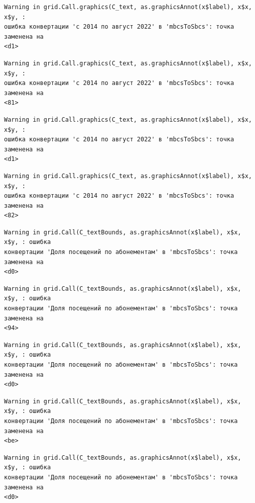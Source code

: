 \documentclass[
  letterpaper,
  DIV=11,
  numbers=noendperiod]{scrreprt}
\begin{document}
\begin{verbatim}
Warning in grid.Call.graphics(C_text, as.graphicsAnnot(x$label), x$x, x$y, :
ошибка конвертации 'с 2014 по август 2022' в 'mbcsToSbcs': точка заменена на
<d1>
\end{verbatim}

\begin{verbatim}
Warning in grid.Call.graphics(C_text, as.graphicsAnnot(x$label), x$x, x$y, :
ошибка конвертации 'с 2014 по август 2022' в 'mbcsToSbcs': точка заменена на
<81>
\end{verbatim}

\begin{verbatim}
Warning in grid.Call.graphics(C_text, as.graphicsAnnot(x$label), x$x, x$y, :
ошибка конвертации 'с 2014 по август 2022' в 'mbcsToSbcs': точка заменена на
<d1>
\end{verbatim}

\begin{verbatim}
Warning in grid.Call.graphics(C_text, as.graphicsAnnot(x$label), x$x, x$y, :
ошибка конвертации 'с 2014 по август 2022' в 'mbcsToSbcs': точка заменена на
<82>
\end{verbatim}

\begin{verbatim}
Warning in grid.Call(C_textBounds, as.graphicsAnnot(x$label), x$x, x$y, : ошибка
конвертации 'Доля посещений по абонементам' в 'mbcsToSbcs': точка заменена на
<d0>
\end{verbatim}

\begin{verbatim}
Warning in grid.Call(C_textBounds, as.graphicsAnnot(x$label), x$x, x$y, : ошибка
конвертации 'Доля посещений по абонементам' в 'mbcsToSbcs': точка заменена на
<94>
\end{verbatim}

\begin{verbatim}
Warning in grid.Call(C_textBounds, as.graphicsAnnot(x$label), x$x, x$y, : ошибка
конвертации 'Доля посещений по абонементам' в 'mbcsToSbcs': точка заменена на
<d0>
\end{verbatim}

\begin{verbatim}
Warning in grid.Call(C_textBounds, as.graphicsAnnot(x$label), x$x, x$y, : ошибка
конвертации 'Доля посещений по абонементам' в 'mbcsToSbcs': точка заменена на
<be>
\end{verbatim}

\begin{verbatim}
Warning in grid.Call(C_textBounds, as.graphicsAnnot(x$label), x$x, x$y, : ошибка
конвертации 'Доля посещений по абонементам' в 'mbcsToSbcs': точка заменена на
<d0>
\end{verbatim}
\end{document}
